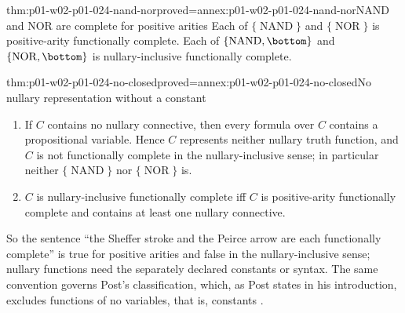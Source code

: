 \begin{hbtheorem}{thm:p01-w02-p01-024-nand-nor}{proved=annex:p01-w02-p01-024-nand-nor}{NAND and NOR are complete for positive arities}
Each of \(\{\operatorname{NAND}\}\) and \(\{\operatorname{NOR}\}\) is
positive-arity functionally complete.  Each of
\(\{\operatorname{NAND},\bottom\}\) and \(\{\operatorname{NOR},\bottom\}\)
is nullary-inclusive functionally complete.
\end{hbtheorem}

\begin{hbtheorem}{thm:p01-w02-p01-024-no-closed}{proved=annex:p01-w02-p01-024-no-closed}{No nullary representation without a constant}
\begin{enumerate}
\item If \(C\) contains no nullary connective, then every formula over \(C\)
  contains a propositional variable.  Hence \(C\) represents neither
  nullary truth function, and \(C\) is not functionally complete in the
  nullary-inclusive sense; in particular neither \(\{\operatorname{NAND}\}\)
  nor \(\{\operatorname{NOR}\}\) is.
\item \(C\) is nullary-inclusive functionally complete iff \(C\) is
  positive-arity functionally complete and contains at least one nullary
  connective.
\end{enumerate}
\end{hbtheorem}

So the sentence ``the Sheffer stroke and the Peirce arrow are each
functionally complete'' is true for positive arities and false in the
nullary-inclusive sense; nullary functions need the separately declared
constants or syntax.  The same convention governs Post's classification,
which, as Post states in his introduction, excludes functions of no
variables, that is, constants
\cite[Introduction, p.~2, n.~5]{Post1941}.

